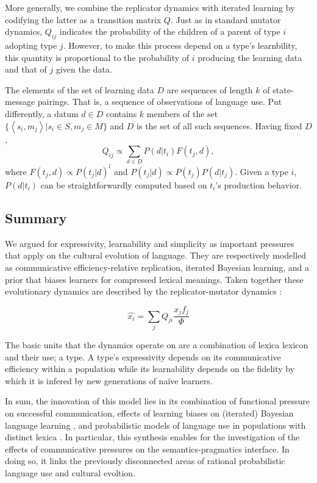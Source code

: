 \documentclass[a4paper]{article}
\newcommand{\tuple}[1]{\ensuremath{\left\langle #1 \right\rangle}}
\begin{document}
More generally, we combine the replicator dynamics with iterated learning by codifying the latter as a transition matrix $Q$. Just as in standard mutator dynamics, $Q_{ij}$ indicates the probability of the children of a parent of type $i$ adopting type $j$. However, to make this process depend on a type's learnbility, this quantity is proportional to the probability of $i$ producing the learning data and that of $j$ given the data. 

The elements of the set of learning data $D$ are sequences of length $k$ of state-message pairings. That is, a sequence of observations of language use. Put differently, a datum $d \in D$ contains $k$ members of the set $\{\tuple{s_i,m_j} | s_i \in S, m_j \in M\}$ and $D$ is the set of all such sequences. Having fixed $D$,
\[
 Q_{ij} \propto \sum_{d \in D} P(d|t_i) F(t_j,d),
\]
where $F(t_j,d) \propto P(t_j|d)^l$ and $P(t_j|d) \propto P(t_j) P(d|t_j)$. Given a type $i$, $P(d|t_i)$ can be straightforwardly computed based on $t_i$'s production behavior. 
 

\subsection{Summary}
We argued for expressivity, learnability and simplicity as important pressures that apply on the cultural evolution of language. They are respectively modelled as communicative efficiency-relative replication, iterated Bayesian learning, and a prior that biases learners for compressed lexical meanings. Taken together these evolutionary dynamics are described by the replicator-mutator dynamics \citep{hofbauer+sigmund:2003}: 

\[ 
\hat{x_i} = \sum_j Q_{ji} \frac{x_jf_j}{\Phi}
\]

The basic units that the dynamics operate on are a combination of lexica lexicon and their use; a type. A type's expressivity depends on its communicative efficiency within a population while its learnability depends on the fidelity by which it is infered by new generations of na\"ive learners. 

In sum, the innovation of this model lies in its combination of functional pressure on successful communication, effects of learning biases on (iterated) Bayesian language learning \citealt{griffiths+kalish:2007}, and probabilistic models of language use in populations with distinct lexica \citep{frank+goodman:2012,franke+jaeger:2014,bergen+etal:2016}. In particular, this synthesis enables for the investigation of the effects of communicative pressures on the semantics-pragmatics interface. In doing so, it links the previously disconnected areas of rational probabilistic language use and cultural evoltion.
\end{document}
